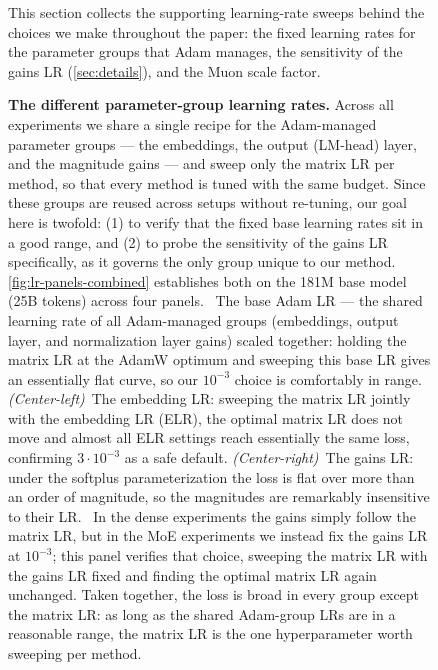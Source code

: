 \documentclass[10pt]{article} %
\begin{document}
\begin{figure}[t]
This section collects the supporting learning-rate sweeps behind the choices we make throughout the paper: the fixed learning rates for the parameter groups that Adam manages, the sensitivity of the gains LR (\autoref{sec:details}), and the Muon scale factor.

\textbf{The different parameter-group learning rates.} Across all experiments we share a single recipe for the Adam-managed parameter groups --- the embeddings, the output (LM-head) layer, and the magnitude gains --- and sweep only the matrix LR per method, so that every method is tuned with the same budget. Since these groups are reused across setups without re-tuning, our goal here is twofold: (1) to verify that the fixed base learning rates sit in a good range, and (2) to probe the sensitivity of the gains LR specifically, as it governs the only group unique to our method. \autoref{fig:lr-panels-combined} establishes both on the 181M base model (25B tokens) across four panels. \figleft~The base Adam LR --- the shared learning rate of all Adam-managed groups (embeddings, output layer, and normalization layer gains) scaled together: holding the matrix LR at the AdamW optimum and sweeping this base LR gives an essentially flat curve, so our $10^{-3}$ choice is comfortably in range. \emph{(Center-left)}~The embedding LR: sweeping the matrix LR jointly with the embedding LR (ELR), the optimal matrix LR does not move and almost all ELR settings reach essentially the same loss, confirming $3\cdot10^{-3}$ as a safe default. \emph{(Center-right)}~The gains LR: under the softplus parameterization the loss is flat over more than an order of magnitude, so the magnitudes are remarkably insensitive to their LR. \figright~In the dense experiments the gains simply follow the matrix LR, but in the MoE experiments we instead fix the gains LR at $10^{-3}$; this panel verifies that choice, sweeping the matrix LR with the gains LR fixed and finding the optimal matrix LR again unchanged. Taken together, the loss is broad in every group except the matrix LR: as long as the shared Adam-group LRs are in a reasonable range, the matrix LR is the one hyperparameter worth sweeping per method.


\end{figure}
\end{document}
